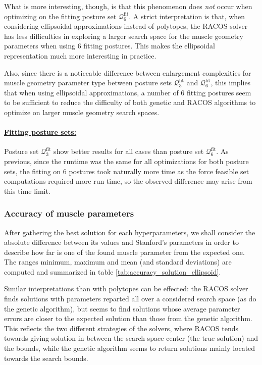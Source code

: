What is more interesting, though, is that this phenomenon does \emph{not} occur when optimizing on the fitting posture set $\mathcal{Q}_6^{\text{fit}}$. A strict interpretation is that, when considering ellipsoidal approximations instead of polytopes, the RACOS solver has less difficulties in exploring a larger search space for the muscle geometry parameters when using 6 fitting postures. This makes the ellipsoidal representation much more interesting in practice.

Also, since there is a noticeable difference between enlargement complexities for muscle geometry parameter type between posture sets $\mathcal{Q}_3^{\text{fit}}$ and $\mathcal{Q}_6^{\text{fit}}$, this implies that when using ellipsoidal approximations, a number of 6 fitting postures seem to be sufficient to reduce the difficulty of both genetic and RACOS algorithms to optimize on larger muscle geometry search spaces.


\paragraph*{\underline{Fitting posture sets:}}
Posture set $\mathcal{Q}_3^{\text{fit}}$ show better results for all cases than posture set $\mathcal{Q}_6^{\text{fit}}$. As previous, since the runtime was the same for all optimizations for both posture sets, the fitting on 6 postures took naturally more time as the force feasible set computations required more run time, so the observed difference may arise from this time limit.

\subsubsection*{Accuracy of muscle parameters}
After gathering the best solution for each hyperparameters, we shall consider the absolute difference between its values and Stanford's parameters in order to describe how far is one of the found muscle parameter from the expected one. The ranges minimum, maximum and mean (and standard deviations) are computed and summarized in table \ref{tab:accuracy_solution_ellipsoid}.

Similar interpretations than with polytopes can be effected: the RACOS solver finds solutions with parameters reparted all over a considered search space (as do the genetic algorithm), but seems to find solutions whose average parameter errors are closer to the expected solution than those from the genetic algorithm. This reflects the two different strategies of the solvers, where RACOS tends towards giving solution in between the search space center (the true solution) and the bounds, while the genetic algorithm seems to return solutions mainly located towards the search bounds.

